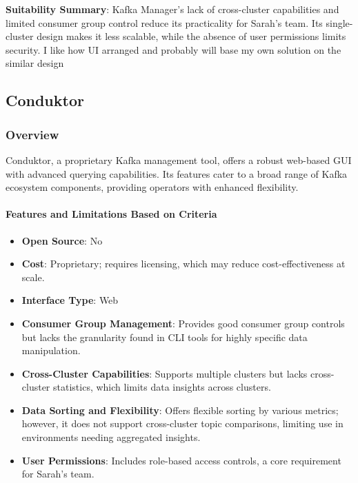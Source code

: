 \documentclass[10pt , a4paper]{report}
\begin{document}
\textbf{Suitability Summary}: Kafka Manager’s lack of cross-cluster capabilities and limited consumer group control reduce its practicality for Sarah’s team. Its single-cluster design makes it less scalable, while the absence of user permissions limits security. I like how UI arranged and probably will base my own solution on the similar design

\subsection{Conduktor} 
\subsubsection*{Overview} 
Conduktor, a proprietary Kafka management tool, offers a robust web-based GUI with advanced querying capabilities. Its features cater to a broad range of Kafka ecosystem components, providing operators with enhanced flexibility.

\paragraph{Features and Limitations Based on Criteria}
\begin{itemize} 
    \item \small \textbf{Open Source}: No
    \item \small \textbf{Cost}: Proprietary; requires licensing, which may reduce cost-effectiveness at scale.
    \item \small \textbf{Interface Type}: Web
    \item \small \textbf{Consumer Group Management}: Provides good consumer group controls but lacks the granularity found in CLI tools for highly specific data manipulation.
    \item \small \textbf{Cross-Cluster Capabilities}: Supports multiple clusters but lacks cross-cluster statistics, which limits data insights across clusters.
    \item \small \textbf{Data Sorting and Flexibility}: Offers flexible sorting by various metrics; however, it does not support cross-cluster topic comparisons, limiting use in environments needing aggregated insights.
    \item \small \textbf{User Permissions}: Includes role-based access controls, a core requirement for Sarah’s team.
\end{itemize}
\end{document}
